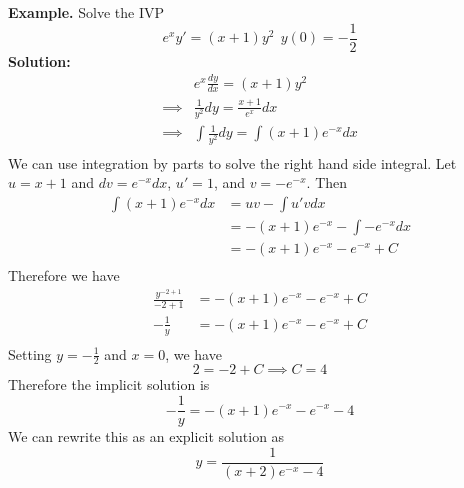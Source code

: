 \documentclass[openany]{report}
\begin{document}
\textbf{Example.} Solve the IVP
\[e^xy' = (x+1)y^2 \ \ y(0) = -\frac{1}{2}\]
\textbf{Solution:} 
\begin{align*}
    &e^x\frac{dy}{dx} = (x+1)y^2 \\
    \implies& \frac{1}{y^2}dy = \frac{x+1}{e^x}dx \\
    \implies& \int \frac{1}{y^2}dy = \int (x+1)e^{-x}dx \\
\end{align*}
We can use integration by parts to solve the right hand side integral. Let $u = x+1$ and $dv = e^{-x}dx$, $u' = 1$, and $v = -e^{-x}$. Then 
\begin{align*}
    \int (x+1)e^{-x}dx &= uv - \int u'vdx\\
    &= -(x+1)e^{-x} - \int -e^{-x}dx\\
    &= -(x+1)e^{-x} - e^{-x} + C\\
\end{align*}
Therefore we have 
\begin{align*}
    \frac{y^{-2 +1}}{-2 + 1} &= -(x+1)e^{-x} - e^{-x} + C\\
    -\frac{1}{y} &= -(x+1)e^{-x} - e^{-x} + C\\
\end{align*}
Setting $y = -\frac{1}{2}$ and $x = 0$, we have 
\[2 = -2 + C \implies C = 4\]
Therefore the implicit solution is 
\[-\frac{1}{y} = -(x+1)e^{-x} - e^{-x} - 4\]
We can rewrite this as an explicit solution as 
\[y = \frac{1}{(x+2)e^{-x}-4}\]
\end{document}
